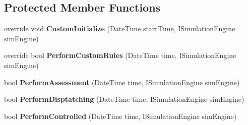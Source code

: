 \subsection*{Protected Member Functions}
\begin{DoxyCompactItemize}
\item 
override void {\bfseries Custom\+Initialize} (Date\+Time start\+Time, I\+Simulation\+Engine sim\+Engine)\hypertarget{class_general_health_elements_1_1_inpatient_1_1_control_units_1_1_control_unit_inpatient_detailed_a39ccefdd9959fcd9f42a09e76719afdd}{}\label{class_general_health_elements_1_1_inpatient_1_1_control_units_1_1_control_unit_inpatient_detailed_a39ccefdd9959fcd9f42a09e76719afdd}

\item 
override bool {\bfseries Perform\+Custom\+Rules} (Date\+Time time, I\+Simulation\+Engine sim\+Engine)\hypertarget{class_general_health_elements_1_1_inpatient_1_1_control_units_1_1_control_unit_inpatient_detailed_ad9621576d57b01764f009e68f635c3a0}{}\label{class_general_health_elements_1_1_inpatient_1_1_control_units_1_1_control_unit_inpatient_detailed_ad9621576d57b01764f009e68f635c3a0}

\item 
bool {\bfseries Perform\+Assessment} (Date\+Time time, I\+Simulation\+Engine sim\+Engine)\hypertarget{class_general_health_elements_1_1_inpatient_1_1_control_units_1_1_control_unit_inpatient_detailed_ab003f44bdd886202517f1fa37a29feaf}{}\label{class_general_health_elements_1_1_inpatient_1_1_control_units_1_1_control_unit_inpatient_detailed_ab003f44bdd886202517f1fa37a29feaf}

\item 
bool {\bfseries Perform\+Disptatching} (Date\+Time time, I\+Simulation\+Engine sim\+Engine)\hypertarget{class_general_health_elements_1_1_inpatient_1_1_control_units_1_1_control_unit_inpatient_detailed_ad0d816891f33f1e4515127c7460d8318}{}\label{class_general_health_elements_1_1_inpatient_1_1_control_units_1_1_control_unit_inpatient_detailed_ad0d816891f33f1e4515127c7460d8318}

\item 
bool {\bfseries Perform\+Controlled} (Date\+Time time, I\+Simulation\+Engine sim\+Engine)\hypertarget{class_general_health_elements_1_1_inpatient_1_1_control_units_1_1_control_unit_inpatient_detailed_a90ec05cc243f4bdc9442cc6b9eafce72}{}\label{class_general_health_elements_1_1_inpatient_1_1_control_units_1_1_control_unit_inpatient_detailed_a90ec05cc243f4bdc9442cc6b9eafce72}

\end{DoxyCompactItemize}
